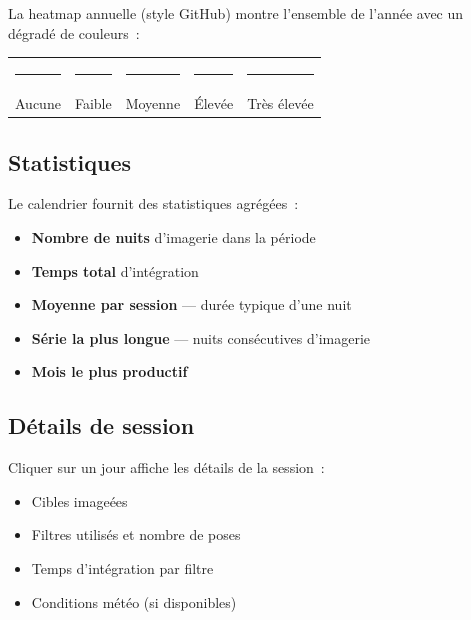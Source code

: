 \documentclass[a4paper,11pt]{article}
\begin{document}
La heatmap annuelle (style GitHub) montre l'ensemble de l'ann\'{e}e avec un d\'{e}grad\'{e} de couleurs~:

\begin{center}
\begin{tabular}{ccccc}
\textcolor[HTML]{0a0e1a}{\rule{0.8cm}{0.8cm}} &
\textcolor[HTML]{1a2a3a}{\rule{0.8cm}{0.8cm}} &
\textcolor[HTML]{2a4a5a}{\rule{0.8cm}{0.8cm}} &
\textcolor[HTML]{4a7a8a}{\rule{0.8cm}{0.8cm}} &
\textcolor[HTML]{94b8c8}{\rule{0.8cm}{0.8cm}} \\
\small Aucune & \small Faible & \small Moyenne & \small \'{E}lev\'{e}e & \small Tr\`{e}s \'{e}lev\'{e}e
\end{tabular}
\end{center}

\subsection{Statistiques}

Le calendrier fournit des statistiques agr\'{e}g\'{e}es~:

\begin{itemize}
    \item \textbf{Nombre de nuits} d'imagerie dans la p\'{e}riode
    \item \textbf{Temps total} d'int\'{e}gration
    \item \textbf{Moyenne par session} --- dur\'{e}e typique d'une nuit
    \item \textbf{S\'{e}rie la plus longue} --- nuits cons\'{e}cutives d'imagerie
    \item \textbf{Mois le plus productif}
\end{itemize}

\subsection{D\'{e}tails de session}

Cliquer sur un jour affiche les d\'{e}tails de la session~:

\begin{itemize}
    \item Cibles image\'{e}es
    \item Filtres utilis\'{e}s et nombre de poses
    \item Temps d'int\'{e}gration par filtre
    \item Conditions m\'{e}t\'{e}o (si disponibles)
\end{itemize}
\end{document}
